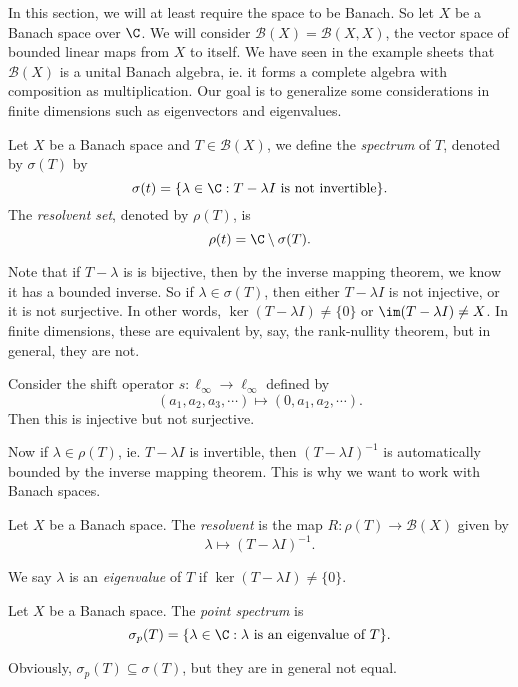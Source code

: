 \documentclass[a4paper]{article}
\begin{document}
In this section, we will at least require the space to be Banach. So let $X$ be a Banach space over $\C$. We will consider $\mathcal{B}(X) = \mathcal{B}(X, X)$, the vector space of bounded linear maps from $X$ to itself. We have seen in the example sheets that $\mathcal{B}(X)$ is a unital Banach algebra, ie. it forms a complete algebra with composition as multiplication. Our goal is to generalize some considerations in finite dimensions such as eigenvectors and eigenvalues.

\begin{defi}
  Let $X$ be a Banach space and $T \in \mathcal{B}(X)$, we define the \emph{spectrum} of $T$, denoted by $\sigma(T)$ by
  \[
    \sigma(t) = \{\lambda \in \C: T - \lambda I\text{ is not invertible}\}.
  \]
  The \emph{resolvent set}, denoted by $\rho(T)$, is
  \[
    \rho(t) = \C \setminus \sigma(T).
  \]
\end{defi}
Note that if $T - \lambda$ is is bijective, then by the inverse mapping theorem, we know it has a bounded inverse. So if $\lambda \in \sigma(T)$, then either $T - \lambda I$ is not injective, or it is not surjective. In other words, $\ker (T - \lambda I) \not= \{0\}$ or $\im (T - \lambda I) \not= X$. In finite dimensions, these are equivalent by, say, the rank-nullity theorem, but in general, they are not.

\begin{eg}
  Consider the shift operator $s: \ell_\infty \to \ell_\infty$ defined by
  \[
    (a_1, a_2, a_3, \cdots) \mapsto (0, a_1, a_2, \cdots).
  \]
  Then this is injective but not surjective.
\end{eg}
Now if $\lambda \in \rho(T)$, ie. $T - \lambda I$ is invertible, then $(T - \lambda I)^{-1}$ is automatically bounded by the inverse mapping theorem. This is why we want to work with Banach spaces.

\begin{defi}[Resolvent]
  Let $X$ be a Banach space. The \emph{resolvent} is the map $R: \rho(T) \to \mathcal{B}(X)$ given by
  \[
    \lambda \mapsto (T - \lambda I)^{-1}.
  \]
\end{defi}

\begin{defi}[Eigenvalue]
  We say $\lambda$ is an \emph{eigenvalue} of $T$ if $\ker (T - \lambda I) \not= \{0\}$.
\end{defi}

\begin{defi}
  Let $X$ be a Banach space. The \emph{point spectrum} is
  \[
    \sigma_p(T) = \{\lambda \in \C: \lambda\text{ is an eigenvalue of }T\}.
  \]
\end{defi}
Obviously, $\sigma_p(T) \subseteq \sigma(T)$, but they are in general not equal.
\end{document}
